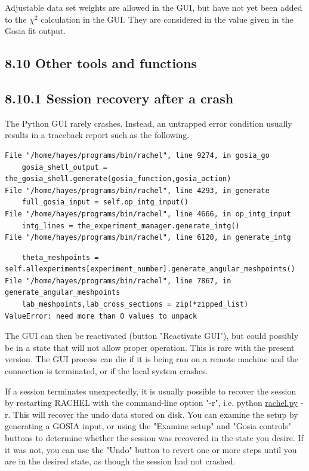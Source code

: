 \documentclass[10pt]{article}
\begin{document}
Adjustable data set weights are allowed in the GUI, but have not yet been added to the $\chi^{2}$ calculation in the GUI. They are considered in the value given in the Gosia fit output.

\subsection*{8.10 Other tools and functions}
\subsection*{8.10.1 Session recovery after a crash}
The Python GUI rarely crashes. Instead, an untrapped error condition usually results in a traceback report such as the following.

\begin{verbatim}
File "/home/hayes/programs/bin/rachel", line 9274, in gosia_go
    gosia_shell_output = the_gosia_shell.generate(gosia_function,gosia_action)
File "/home/hayes/programs/bin/rachel", line 4293, in generate
    full_gosia_input = self.op_intg_input()
File "/home/hayes/programs/bin/rachel", line 4666, in op_intg_input
    intg_lines = the_experiment_manager.generate_intg()
File "/home/hayes/programs/bin/rachel", line 6120, in generate_intg
\end{verbatim}

\begin{verbatim}
    theta_meshpoints = self.allexperiments[experiment_number].generate_angular_meshpoints()
File "/home/hayes/programs/bin/rachel", line 7867, in generate_angular_meshpoints
    lab_meshpoints,lab_cross_sections = zip(*zipped_list)
ValueError: need more than O values to unpack
\end{verbatim}

The GUI can then be reactivated (button "Reactivate GUI"), but could possibly be in a state that will not allow proper operation. This is rare with the present version. The GUI process can die if it is being run on a remote machine and the connection is terminated, or if the local system crashes.

If a session terminates unexpectedly, it is usually possible to recover the session by restarting RACHEL with the command-line option "-r", i.e. python \href{http://rachel.py}{rachel.py} -r. This will recover the undo data stored on disk. You can examine the setup by generating a GOSIA input, or using the "Examine setup" and "Gosia controls" buttons to determine whether the session was recovered in the state you desire. If it was not, you can use the "Undo" button to revert one or more steps until you are in the desired state, as though the session had not crashed.
\end{document}
